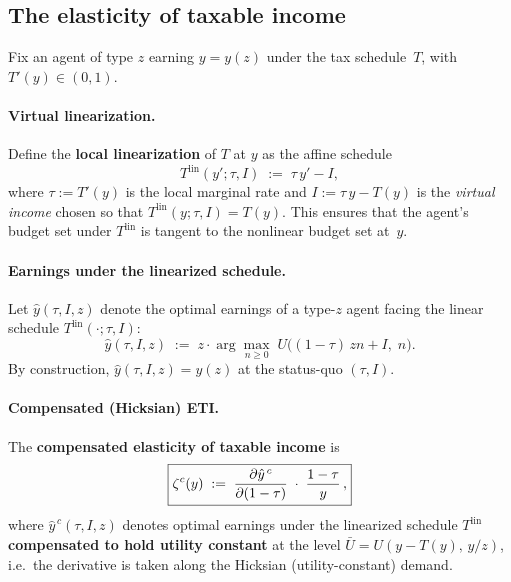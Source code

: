\documentclass[12pt,a4paper]{article}
\theoremstyle{definition}
\theoremstyle{plain}
\theoremstyle{remark}
\begin{document}
\subsection{The elasticity of taxable income}
\label{sec:ETI}

Fix an agent of type $z$ earning $y = y(z)$ under the tax
schedule~$T$, with $T'(y)\in(0,1)$.

\paragraph{Virtual linearization.}
Define the \textbf{local linearization} of $T$ at $y$ as the
affine schedule
\begin{equation}
\label{eq:linearized-schedule-pert}
  T^{\mathrm{lin}}(y';\tau,I) \;:=\; \tau\, y' - I,
\end{equation}
where $\tau := T'(y)$ is the local marginal rate and
$I := \tau\, y - T(y)$ is the \emph{virtual income} chosen so
that $T^{\mathrm{lin}}(y;\tau,I) = T(y)$. This ensures that the
agent's budget set under $T^{\mathrm{lin}}$ is tangent to the
nonlinear budget set at~$y$.

\paragraph{Earnings under the linearized schedule.}
Let $\hat{y}(\tau,I,z)$ denote the optimal earnings of a
type-$z$ agent facing the linear schedule
$T^{\mathrm{lin}}(\cdot;\tau,I)$:
\begin{equation}
\label{eq:linearized-problem-pert}
  \hat{y}(\tau,I,z)
  \;:=\;
  z\cdot\arg\max_{n\ge 0}\;
  U\!\bigl((1-\tau)\,zn + I,\; n\bigr).
\end{equation}
By construction, $\hat{y}(\tau,I,z) = y(z)$ at the status-quo
$(\tau,I)$.

\paragraph{Compensated (Hicksian) ETI.}
The \textbf{compensated elasticity of taxable income} is
\begin{equation}
\label{eq:ETI-def}
  \boxed{%
  \zeta^c(y)
  \;:=\;
  \frac{\partial \hat{y}^{\,c}}{\partial (1-\tau)}
  \;\cdot\;
  \frac{1-\tau}{y}\,,}
\end{equation}
where $\hat{y}^{\,c}(\tau,I,z)$ denotes optimal earnings under
the linearized schedule $T^{\mathrm{lin}}$ \textbf{compensated to hold utility
constant} at the level $\bar U = U(y-T(y),\,y/z)$, i.e.\ the
derivative is taken along the Hicksian (utility-constant) demand.
\end{document}
